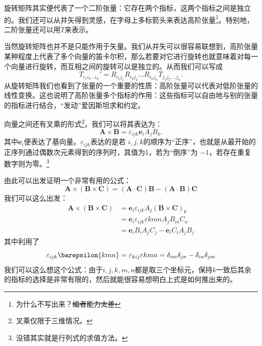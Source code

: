 \documentclass[12pt,a4paper,openany,twoside]{book}
\numberwithin{equation}{section}
\begin{document}
旋转矩阵其实便代表了一个二阶张量：它存在两个指标，这两个指标之间是独立的。我们还可以从并矢得到灵感，在字母上多标箭头来表达高阶张量\footnote{为什么不写出来？\sout{编者\latex 能力太差}}。特别地，二阶张量还可以用$\overleftrightarrow{T}$来表示。

当然旋转矩阵也并不是只能作用于矢量。我们从并矢可以很容易联想到，高阶张量某种程度上代表了多个向量的笛卡尔积，那么若要对它进行旋转也就意味着对每一个向量进行旋转，而互相之间的旋转可以是独立的。从而我们可以写成
\[
	T_{i_1i_2...i_n}' = R_{i_1j_1} R_{i_2j_2} ... R_{i_n j_n} T_{j_1j_2....j_n}
.\] 
从旋转矩阵我们也看到了张量的一个重要的性质：高阶张量可以代表对低阶张量的线性变换。这也说明了高阶张量多个指标的作用：这些指标可以自由地与别的张量的指标进行结合，``发动''爱因斯坦求和约定。

向量之间还有叉乘的形式\footnote{叉乘仅限于三维情况。}，我们可以将其表达为：
\[
	\mathbf{A} \times \mathbf{B} = \varepsilon_{ijk} \mathbf{e}_i A_j B_k
.\] 
其中$\mathbf{e}_i$便表达了基向量。$\varepsilon_{ijk}$表达的是若 $i,j,k$的顺序为``正序''，也就是从最开始的正序列通过偶数次元素得到的序列时，其值为1，若为``倒序''为 $-1$，若存在重复数字则为零。\footnote{没错其实就是行列式的求值方法。}

由此可以出发证明一个非常有用的公式：
\begin{equation}
	\mathbf{A}\times (\mathbf{B}\times \mathbf{C}) = (\mathbf{A} \cdot \mathbf{C}) \mathbf{B} - (\mathbf{A} \cdot \mathbf{B}) \mathbf{C}
\end{equation} 
我们可以这么出发：
\begin{align*}
	\mathbf{A} \times (\mathbf{B} \times \mathbf{C}) &= \mathbf{e}_i \varepsilon_{ijk} A_j (\mathbf{B} \times \mathbf{C})_k \\
							 &= \mathbf{e}_i \varepsilon_{ijk} \varepsilon{kmn} A_j B_m C_n \\
							 &= \mathbf{e}_i B_iA_j C_j - \mathbf{e}_i C_i A_j B_j
\end{align*}
其中利用了
\begin{equation}
	\varepsilon_{ijk}\barepsilon{kmn} = \varepsilon_{kij} \varepsilon{kmn} = \delta_{im} \delta_{jn} - \delta_{in}\delta_{jm}
\end{equation} 
我们可以这么想这个公式：由于$i,j,k,m,n$都是取三个坐标元，保持$k$一致后其余的指标的选择是非常有限的，然后就能很容易想明白上式是如何推出来的。
\end{document}
